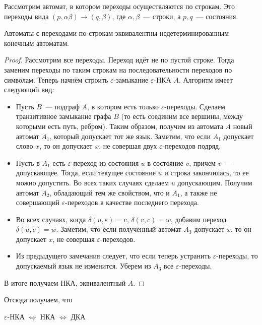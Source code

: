 \documentclass[a4paper,12pt]{article}
\begin{document}
	Рассмотрим автомат, в котором переходы осуществляются по строкам. Это переходы вида $(p, \alpha\beta) \to (q, \beta)$, где $\alpha,\beta$~--- строки, а $p, q$~--- состояния.
	
	\begin{theorem}
		Автоматы с переходами по строкам эквивалентны недетерминированным конечным автоматам.
	\end{theorem}
	\begin{proof}
		Рассмотрим все переходы. Переход идёт не по пустой строке. Тогда заменим переходы по таким строкам на последовательности переходов по символам. Теперь начнём строить $\varepsilon$-замыкание $\varepsilon$-НКА $A$. Алгоритм имеет следующий вид:
		\begin{itemize}
			\item Пусть $B$~--- подграф $A$, в котором есть только $\varepsilon$-переходы. Сделаем транзитивное замыкание графа $B$ (то есть соединим все вершины, между которыми есть путь, ребром). Таким образом, получим из автомата $A$ новый автомат $A_1$, который допускает тот же язык. Заметим, что если $A_1$ допускает слово $x$, то он допускает $x$, не совершая двух $\varepsilon$-переходов подряд.
			\item Пусть в $A_1$ есть $\varepsilon$-переход из состояния $u$ в состояние $v$, причем $v$~--- допускающее. Тогда, если текущее состояние $u$ и строка закончилась, то ее можно допустить. Во всех таких случаях сделаем $u$ допускающим. Получим автомат $A_2$, обладающий тем же свойством, что и $A_1$, а также не совершающий $\varepsilon$-переходов в качестве последнего перехода.
			\item Во всех случаях, когда $\delta(u,\varepsilon)=v$, $\delta(v,c)=w$, добавим переход $\delta(u,c)=w$. Заметим, что если полученный автомат $A_3$ допускает $x$, то он допускает $x$, не совершая $\varepsilon$-переходов.
			\item Из предыдущего замечания следует, что если теперь устранить $\varepsilon$-переходы, то допускаемый язык не изменится. Уберем из $A_3$ все $\varepsilon$-переходы.
		\end{itemize}
		В итоге получаем НКА, эквивалентный $A$.
	\end{proof}
	Отсюда получаем, что 
	\begin{center}
		$\varepsilon$-НКА $\iff$ НКА $\iff$ ДКА
	\end{center}
	
\end{document}

